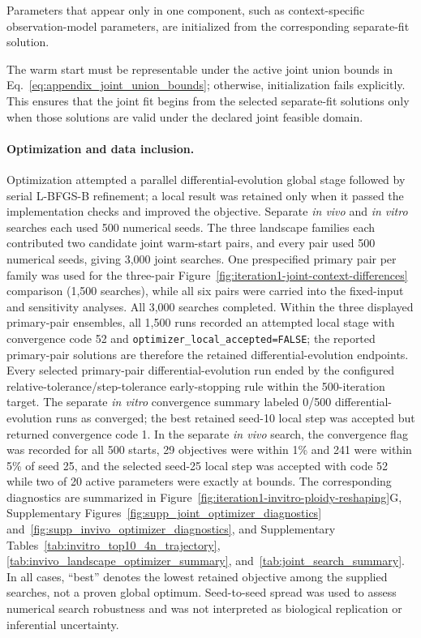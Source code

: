 \documentclass[11pt]{article}
\begin{document}
Parameters that appear only in one component, such as context-specific observation-model parameters, are initialized from the corresponding separate-fit solution.

The warm start must be representable under the active joint union bounds in Eq.~\eqref{eq:appendix_joint_union_bounds}; otherwise, initialization fails explicitly. This ensures that the joint fit begins from the selected separate-fit solutions only when those solutions are valid under the declared joint feasible domain.


\paragraph{Optimization and data inclusion.}

Optimization attempted a parallel differential-evolution global stage followed by serial L-BFGS-B refinement; a local result was retained only when it passed the implementation checks and improved the objective. Separate \textit{in vivo} and \textit{in vitro} searches each used 500 numerical seeds. The three landscape families each contributed two candidate joint warm-start pairs, and every pair used 500 numerical seeds, giving 3,000 joint searches. One prespecified primary pair per family was used for the three-pair Figure~\ref{fig:iteration1-joint-context-differences} comparison (1,500 searches), while all six pairs were carried into the fixed-input and sensitivity analyses. All 3,000 searches completed. Within the three displayed primary-pair ensembles, all 1,500 runs recorded an attempted local stage with convergence code 52 and \texttt{optimizer\_local\_accepted=FALSE}; the reported primary-pair solutions are therefore the retained differential-evolution endpoints. Every selected primary-pair differential-evolution run ended by the configured relative-tolerance/step-tolerance early-stopping rule within the 500-iteration target. The separate \textit{in vitro} convergence summary labeled 0/500 differential-evolution runs as converged; the best retained seed-10 local step was accepted but returned convergence code 1. In the separate \textit{in vivo} search, the convergence flag was recorded for all 500 starts, 29 objectives were within 1\% and 241 were within 5\% of seed 25, and the selected seed-25 local step was accepted with code 52 while two of 20 active parameters were exactly at bounds. The corresponding diagnostics are summarized in Figure~\ref{fig:iteration1-invitro-ploidy-reshaping}G, Supplementary Figures~\ref{fig:supp_joint_optimizer_diagnostics} and~\ref{fig:supp_invivo_optimizer_diagnostics}, and Supplementary Tables~\ref{tab:invitro_top10_4n_trajectory}, \ref{tab:invivo_landscape_optimizer_summary}, and~\ref{tab:joint_search_summary}. In all cases, ``best'' denotes the lowest retained objective among the supplied searches, not a proven global optimum. Seed-to-seed spread was used to assess numerical search robustness and was not interpreted as biological replication or inferential uncertainty.
\end{document}
